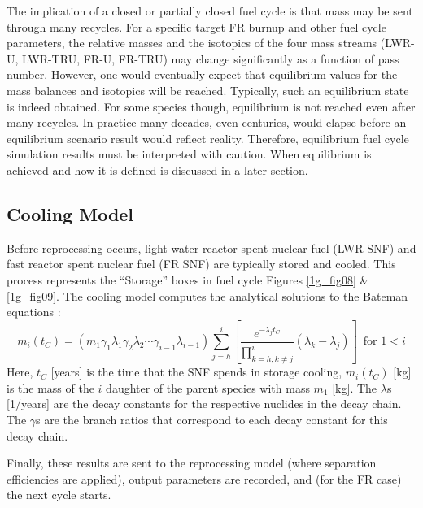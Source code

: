 The implication of a closed or partially closed fuel cycle is that mass may be sent through many recycles.  
For a specific target FR burnup and other fuel cycle parameters, the relative masses and the isotopics of 
the four mass streams (LWR-U, LWR-TRU, FR-U, FR-TRU) may change significantly as a function of pass number.  
However, one would eventually expect that equilibrium values for the mass balances and isotopics will be 
reached.  Typically, such an equilibrium state is indeed obtained.  For some species though, equilibrium is not reached 
even after many recycles. In practice many decades, even centuries, would elapse before an 
equilibrium scenario result would reflect reality.  Therefore, equilibrium fuel cycle simulation 
results must be interpreted with caution.  When equilibrium is achieved and how it is defined is discussed
in a later section.  



\subsection{Cooling Model}
\label{1g_sec:cool_model}
Before reprocessing occurs, light water reactor spent nuclear fuel (LWR SNF) and fast reactor spent 
nuclear fuel (FR SNF) are typically stored and cooled.  This process represents the ``Storage'' boxes in 
fuel cycle Figures \ref{1g_fig08} \& \ref{1g_fig09}.  The cooling model computes the analytical solutions 
to the Bateman equations \cite{Stacey1959}: 
\begin{equation}
\label{1g_bateman}
m_i(t_C) = \left( m_1\gamma_1\lambda_1\gamma_2\lambda_2\cdots\gamma_{i-1}\lambda_{i-1} \right)
            \sum_{j=h}^i \left[\frac{e^{-\lambda_j t_C}}{\prod_{k=h, k\ne j}^i} (\lambda_k - \lambda_j) \right] \, \mbox{ for } 1 < i
\end{equation}
Here, $t_C$ [years] is the time that the SNF spends in storage cooling,  $m_i(t_C)$ [kg] is the 
mass of the $i$ daughter of the parent species with mass $m_1$ [kg]. The $\lambda$s [1/years] 
are the decay constants for the respective nuclides in the decay chain.   The $\gamma$s are the branch ratios 
that correspond to each decay constant for this decay chain.  

Finally, these results are sent to the reprocessing model (where separation efficiencies are applied), output 
parameters are recorded, and (for the FR case) the next cycle starts.   





